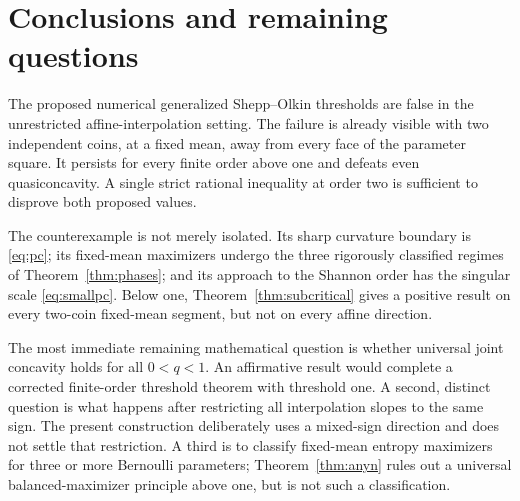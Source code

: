 \documentclass[11pt]{article}
\numberwithin{equation}{section}
\theoremstyle{definition}
\theoremstyle{remark}
\begin{document}

\section{Conclusions and remaining questions}\label{bep:sec:conclusions}
The proposed numerical generalized Shepp--Olkin thresholds are false in the
unrestricted affine-interpolation setting. The failure is already visible
with two independent coins, at a fixed mean, away from every face of the
parameter square. It persists for every finite order above one and defeats
even quasiconcavity. A single strict rational inequality at order two is
sufficient to disprove both proposed values.

The counterexample is not merely isolated. Its sharp curvature boundary is
\eqref{eq:pc}; its fixed-mean maximizers undergo the three rigorously
classified regimes of Theorem~\ref{thm:phases}; and its approach to the
Shannon order has the singular scale \eqref{eq:smallpc}. Below one,
Theorem~\ref{thm:subcritical} gives a positive result on every two-coin
fixed-mean segment, but not on every affine direction.

The most immediate remaining mathematical question is whether universal
joint concavity holds for all $0<q<1$. An affirmative result would complete
a corrected finite-order threshold theorem with threshold one. A second,
distinct question is what happens after restricting all interpolation
slopes to the same sign. The present construction deliberately uses a
mixed-sign direction and does not settle that restriction. A third is to
classify fixed-mean entropy maximizers for three or more Bernoulli
parameters; Theorem~\ref{thm:anyn} rules out a universal balanced-maximizer
principle above one, but is not such a classification.

\noindent[Added 29 September 2026, batch~43: the first question is open in
this report for the ordinary sum studied here. For the joint bit vector,
equivalently a weighted sum with distinct subset sums, Part~II answers it:
R\'enyi entropy yes in every dimension; Tsallis entropy yes exactly when
$n\leq9$, with the sharp fixed-order criterion $n\Psi(q)\leq1$ and failure
at $q=20/41$ from ten bits on (Section~\ref{bep:pe:sec:settles}). A
preprint by Wang \cite{bep:pe:Wang} claims the ordinary-sum threshold is
exactly one; it is recorded there as an unverified external claim, and
this question is not marked answered on its strength. The second and
third questions are not addressed by Part~II.]
\end{document}
